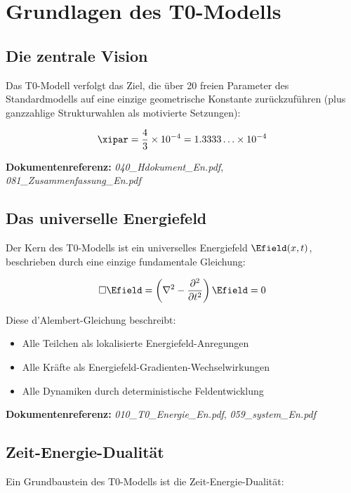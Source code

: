 \section{Grundlagen des T0-Modells}

\subsection{Die zentrale Vision}

Das T0-Modell verfolgt das Ziel, die über 20 freien Parameter des Standardmodells auf eine einzige geometrische Konstante zurückzuführen (plus ganzzahlige Strukturwahlen als motivierte Setzungen):

\begin{equation}
	\xipar = \frac{4}{3} \times 10^{-4} = 1.3333\ldots \times 10^{-4}
\end{equation}

\textbf{Dokumentenreferenz:} \textit{040\_Hdokument\_En.pdf}, \textit{081\_Zusammenfassung\_En.pdf}

\subsection{Das universelle Energiefeld}

Der Kern des T0-Modells ist ein universelles Energiefeld $\Efield(x,t)$, beschrieben durch eine einzige fundamentale Gleichung:

\begin{equation}
	\square \Efield = \left(\nabla^2 - \frac{\partial^2}{\partial t^2}\right) \Efield = 0
\end{equation}

Diese d'Alembert-Gleichung beschreibt:
\begin{itemize}
	\item Alle Teilchen als lokalisierte Energiefeld-Anregungen
	\item Alle Kräfte als Energiefeld-Gradienten-Wechselwirkungen
	\item Alle Dynamiken durch deterministische Feldentwicklung
\end{itemize}

\textbf{Dokumentenreferenz:} \textit{010\_T0\_Energie\_En.pdf}, \textit{059\_system\_En.pdf}

\subsection{Zeit-Energie-Dualität}

Ein Grundbaustein des T0-Modells ist die Zeit-Energie-Dualität:

